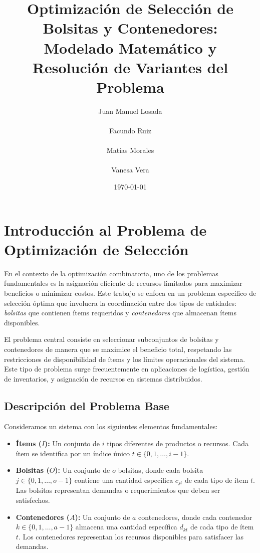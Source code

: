 \documentclass[a4paper,12pt]{article}
\title{Optimización de Selección de Bolsitas y Contenedores:\\[1ex]
       \large Modelado Matemático y Resolución de Variantes del Problema}
\author{Juan Manuel Losada \\\\ Facundo Ruiz \\\\ Matías Morales \\\\ Vanesa Vera}
\date{\today}
\begin{document}
\maketitle
\thispagestyle{empty}
\clearpage

\tableofcontents
\clearpage

\section{Introducción al Problema de Optimización de Selección}

En el contexto de la optimización combinatoria, uno de los problemas fundamentales es la asignación eficiente de recursos limitados para maximizar beneficios o minimizar costos. Este trabajo se enfoca en un problema específico de selección óptima que involucra la coordinación entre dos tipos de entidades: \emph{bolsitas} que contienen ítems requeridos y \emph{contenedores} que almacenan ítems disponibles.

El problema central consiste en seleccionar subconjuntos de bolsitas y contenedores de manera que se maximice el beneficio total, respetando las restricciones de disponibilidad de ítems y los límites operacionales del sistema. Este tipo de problema surge frecuentemente en aplicaciones de logística, gestión de inventarios, y asignación de recursos en sistemas distribuidos.

\subsection{Descripción del Problema Base}

Consideramos un sistema con los siguientes elementos fundamentales:

\begin{itemize}
    \item \textbf{Ítems ($I$):} Un conjunto de $i$ tipos diferentes de productos o recursos. Cada ítem se identifica por un índice único $t \in \{0, 1, \ldots, i-1\}$.
    \item \textbf{Bolsitas ($O$):} Un conjunto de $o$ bolsitas, donde cada bolsita $j \in \{0, 1, \ldots, o-1\}$ contiene una cantidad específica $c_{jt}$ de cada tipo de ítem $t$. Las bolsitas representan demandas o requerimientos que deben ser satisfechos.
    \item \textbf{Contenedores ($A$):} Un conjunto de $a$ contenedores, donde cada contenedor $k \in \{0, 1, \ldots, a-1\}$ almacena una cantidad específica $d_{kt}$ de cada tipo de ítem $t$. Los contenedores representan los recursos disponibles para satisfacer las demandas.
\end{itemize}
\end{document}
